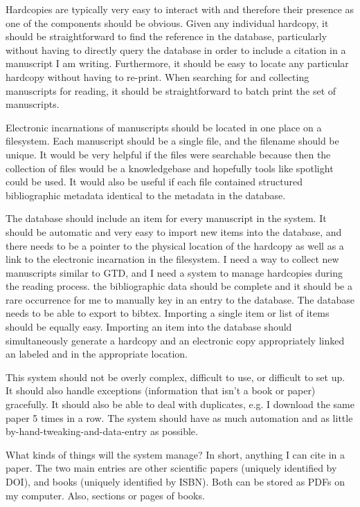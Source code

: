 \documentclass[letterpaper,12pt]{article}
\begin{document}
Hardcopies are typically very easy to interact with and therefore their presence as one of the components should be obvious. Given any individual hardcopy, it should be straightforward to find the reference in the database, particularly without having to directly query the database in order to include a citation in a manuscript I am writing. Furthermore, it should be easy to locate any particular hardcopy without having to re-print. When searching for and collecting manuscripts for reading, it should be straightforward to batch print the set of manuscripts.

Electronic incarnations of manuscripts should be located in one place on a filesystem. Each manuscript should be a single file, and the filename should be unique. It would be very helpful if the files were searchable because then the collection of files would be a knowledgebase and hopefully tools like spotlight could be used. It would also be useful if each file contained structured bibliographic metadata identical to the metadata in the database.

The database should include an item for every manuscript in the system. It should be automatic and very easy to import new items into the database, and there needs to be a pointer to the physical location of the hardcopy as well as a link to the electronic incarnation in the filesystem. I need a way to collect new manuscripts similar to GTD, and I need a system to manage hardcopies during the reading process. the bibliographic data should be complete and it should be a rare occurrence for me to manually key in an entry to the database. The database needs to be able to export to bibtex. Importing a single item or list of items should be equally easy. Importing an item into the database should simultaneously generate a hardcopy and an electronic copy appropriately linked an labeled and in the appropriate location.

This system should not be overly complex, difficult to use, or difficult to set up. It should also handle exceptions (information that isn't a book or paper) gracefully. It should also be able to deal with duplicates, e.g. I download the same paper 5 times in a row. The system should have as much automation and as little by-hand-tweaking-and-data-entry as possible.

What kinds of things will the system manage? In short, anything I can cite in a paper. The two main entries are other scientific papers (uniquely identified by DOI), and books (uniquely identified by ISBN). Both can be stored as PDFs on my computer. Also, sections or pages of books.
\end{document}
